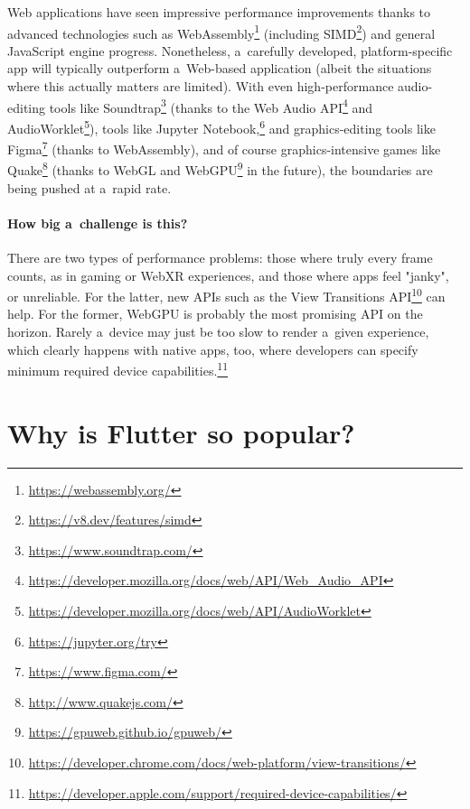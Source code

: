 \documentclass[sigconf]{acmart}
\begin{document}
Web applications have seen impressive performance improvements thanks to advanced technologies such as WebAssembly\footnote{\url{https://webassembly.org/}} (including SIMD\footnote{\url{https://v8.dev/features/simd}}) and general JavaScript engine progress. Nonetheless, a~carefully developed, platform-specific app will typically outperform a~Web-based application (albeit the situations where this actually matters are limited). With even high-performance audio-editing tools like Soundtrap\footnote{\url{https://www.soundtrap.com/}} (thanks to the Web Audio API\footnote{\url{https://developer.mozilla.org/docs/web/API/Web_Audio_API}} and AudioWorklet\footnote{\url{https://developer.mozilla.org/docs/web/API/AudioWorklet}}), tools like Jupyter Notebook,\footnote{\url{https://jupyter.org/try}} and graphics-editing tools like Figma\footnote{\url{https://www.figma.com/}} (thanks to WebAssembly), and of course graphics-intensive games like Quake\footnote{\url{http://www.quakejs.com/}} (thanks to WebGL and WebGPU\footnote{\url{https://gpuweb.github.io/gpuweb/}} in the future), the boundaries are being pushed at a~rapid rate.

\paragraph{How big a~challenge is this?}

There are two types of performance problems: those where truly every frame counts, as in gaming or WebXR experiences, and those where apps feel "janky", or unreliable. For the latter, new APIs such as the View Transitions API\footnote{\url{https://developer.chrome.com/docs/web-platform/view-transitions/}} can help. For the former, WebGPU is probably the most promising API on the horizon. Rarely a~device may just be too slow to render a~given experience, which clearly happens with native apps, too, where developers can specify minimum required device capabilities.\footnote{\url{https://developer.apple.com/support/required-device-capabilities/}}

\section{Why is Flutter so popular?}
\end{document}
